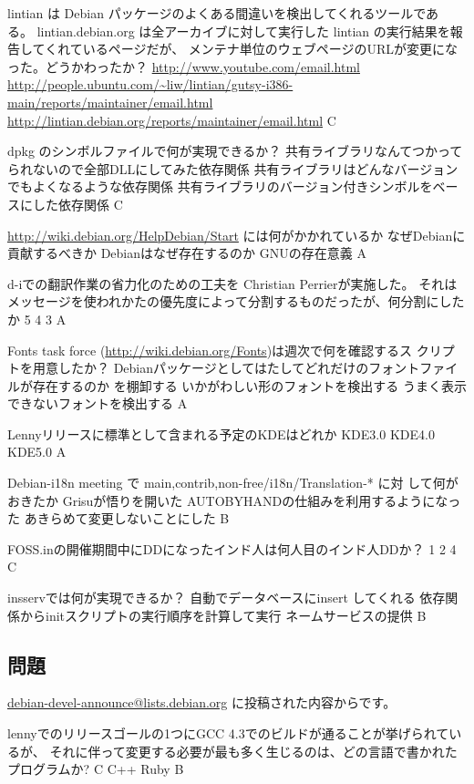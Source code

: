 \documentclass[mingoth,a4paper]{jsarticle}
\begin{document}
\begin{multicols}{2}
 \santaku
 {lintian は Debian パッケージのよくある間違いを検出してくれるツールであ
 る。 lintian.debian.org は全アーカイブに対して実行した lintian の実行結果を報告してくれているページだが、
 メンテナ単位のウェブページのURLが変更になった。どうかわったか？}
 {\url{http://www.youtube.com/email.html}}
 {\url{http://people.ubuntu.com/~liw/lintian/gutsy-i386-main/reports/maintainer/email.html}}
 {\url{http://lintian.debian.org/reports/maintainer/email.html}}
 {C}

 \santaku
 {dpkg のシンボルファイルで何が実現できるか？}
 {共有ライブラリなんてつかってられないので全部DLLにしてみた依存関係}
 {共有ライブラリはどんなバージョンでもよくなるような依存関係}
 {共有ライブラリのバージョン付きシンボルをベースにした依存関係}
 {C}

 \santaku
 {\url{http://wiki.debian.org/HelpDebian/Start} には何がかかれているか}
 {なぜDebianに貢献するべきか}
 {Debianはなぜ存在するのか}
 {GNUの存在意義}
 {A}

 \santaku
 {d-iでの翻訳作業の省力化のための工夫を Christian Perrierが実施した。
 それはメッセージを使われかたの優先度によって分割するものだったが、何分割にしたか}
 {5}
 {4}
 {3}
 {A}

 \santaku
 {Fonts task force (\url{http://wiki.debian.org/Fonts})は週次で何を確認するス
 クリプトを用意したか？}
 {Debianパッケージとしてはたしてどれだけのフォントファイルが存在するのか
 を棚卸する}
 {いかがわしい形のフォントを検出する}
 {うまく表示できないフォントを検出する}
 {A}

 \santaku
 {Lennyリリースに標準として含まれる予定のKDEはどれか}
 {KDE3.0}
 {KDE4.0}
 {KDE5.0}
 {A}

 \santaku
 {Debian-i18n meeting で {main,contrib,non-free}/i18n/Translation-* に対
 して何がおきたか}
 {Grisuが悟りを開いた}
 {AUTOBYHANDの仕組みを利用するようになった}
 {あきらめて変更しないことにした}
 {B}

 \santaku
 {FOSS.inの開催期間中にDDになったインド人は何人目のインド人DDか？}
 {1}
 {2}
 {4}
 {C}

 \santaku
 {insservでは何が実現できるか？}
 {自動でデータベースにinsert してくれる}
 {依存関係からinitスクリプトの実行順序を計算して実行}
 {ネームサービスの提供}
 {B}


\subsection{問題}
\url{debian-devel-announce@lists.debian.org} に投稿された内容からです。

 \santaku
 {lennyでのリリースゴールの1つにGCC 4.3でのビルドが通ることが挙げられているが、
 それに伴って変更する必要が最も多く生じるのは、どの言語で書かれたプログラムか?}
 {C}
 {C++}
 {Ruby}
 {B}
 

\end{multicols}
\end{document}

